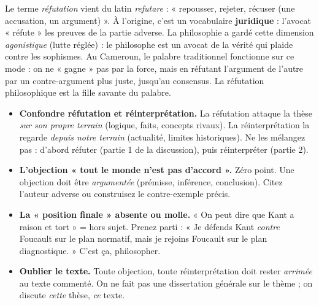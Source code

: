 \documentclass[11pt]{article}
\newcommand{\cle}[1]{{\popxbold\color{popdark}#1}}
\begin{document}
\begin{savaistu}
Le terme \emph{réfutation} vient du latin \emph{refutare} : « repousser, rejeter, récuser (une accusation, un argument) ». À l'origine, c'est un vocabulaire \textbf{juridique} : l'avocat « réfute » les preuves de la partie adverse. La philosophie a gardé cette dimension \emph{agonistique} (lutte réglée) : le philosophe est un avocat de la vérité qui plaide contre les sophismes. Au Cameroun, le \cle{palabre} traditionnel fonctionne sur ce mode : on ne « gagne » pas par la force, mais en réfutant l'argument de l'autre par un contre-argument plus juste, jusqu'au consensus. La réfutation philosophique est la fille savante du palabre.
\end{savaistu}

\begin{attention}
\begin{itemize}
    \item \textbf{Confondre réfutation et réinterprétation.} La réfutation attaque la thèse \emph{sur son propre terrain} (logique, faits, concepts rivaux). La réinterprétation la regarde \emph{depuis notre terrain} (actualité, limites historiques). Ne les mélangez pas : d'abord réfuter (partie 1 de la discussion), puis réinterpréter (partie 2).
    \item \textbf{L'objection « tout le monde n'est pas d'accord ».} Zéro point. Une objection doit être \emph{argumentée} (prémisse, inférence, conclusion). Citez l'auteur adverse ou construisez le contre-exemple précis.
    \item \textbf{La « position finale » absente ou molle.} « On peut dire que Kant a raison et tort » = hors sujet. Prenez parti : « Je défends Kant \emph{contre} Foucault sur le plan normatif, mais je rejoins Foucault sur le plan diagnostique. » C'est ça, philosopher.
    \item \textbf{Oublier le texte.} Toute objection, toute réinterprétation doit rester \emph{arrimée} au texte commenté. On ne fait pas une dissertation générale sur le thème ; on discute \emph{cette} thèse, \emph{ce} texte.
\end{itemize}
\end{attention}
\end{document}
